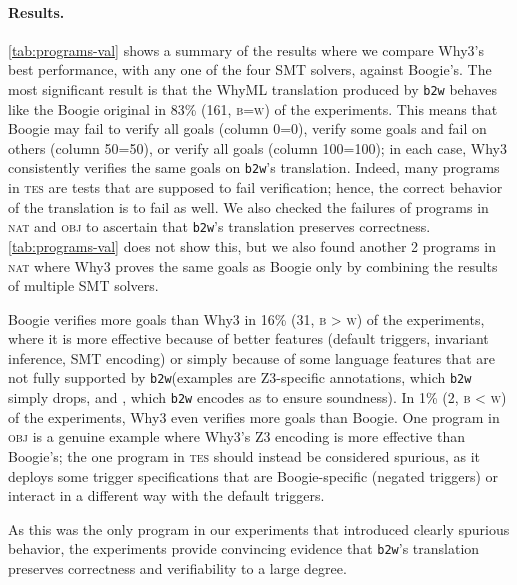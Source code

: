 \documentclass[a4paper,final]{llncs}
\makeatletter
\newif\iflong
\newcommand{\nat}{\textsc{nat}\xspace} \newcommand{\tes}{\textsc{tes}\xspace} \newcommand{\obj}{\textsc{obj}\xspace}
\newcommand{\btw}{\texttt{b2w}\xspace}
\newcommand{\Boogie}{Boogie\xspace}
\newcommand{\WhyML}{WhyML\xspace}
\newcommand{\Why}{Why3\xspace}
\newcommand{\tightParagraph}[1]{\paragraph{#1}}
\newcommand\tightParagraph{\@startsection{paragraph}{4}{\z@}{-5\p@ \@plus -4\p@ \@minus -4\p@}{-0.5em \@plus -0.22em \@minus -0.1em}{\normalfont\normalsize\itshape}}
\makeatother
\begin{document}
\tightParagraph{Results.}
\autoref{tab:programs-val} shows a summary of the results where we compare \Why's best performance, with any one of the four SMT solvers, against \Boogie's.
The most significant result is that the \WhyML translation produced by \btw behaves like the \Boogie original in 83\% (161, \textsc{b=w}) of the experiments.
This means that \Boogie may fail to verify all goals (column \textsc{0=0}), verify some goals and fail on others (column \textsc{50=50}), or verify all goals (column \textsc{100=100}); in each case, \Why consistently verifies the same goals on \btw's translation.
Indeed, many programs in \tes are tests that are supposed to fail verification; hence, the correct behavior of the translation is to fail as well.
We also checked the failures of programs in \nat and \obj to ascertain that \btw's translation preserves correctness.
\autoref{tab:programs-val} does not show this, but we also found another 2 programs in \nat \iflong(\verb|inv_survey/bst| and \verb|rotation/rotation_reverse|)\fi{} where \Why proves the same goals as \Boogie only by combining the results of multiple SMT solvers.


\Boogie verifies more goals than \Why in 16\% (31, \textsc{b > w}) of the experiments, where it is more effective because of better features (default triggers, invariant inference, SMT encoding) or simply because of some language features that are not fully supported by \btw (examples are Z3-specific annotations, which \btw simply drops, and , which \btw encodes as  to ensure soundness).
In 1\% (2, \textsc{b < w}) of the experiments, \Why even verifies more goals than \Boogie.
One program in \obj \iflong(\verb|rotation_by_copy|)\fi{} is a genuine example where \Why's Z3 encoding is more effective than \Boogie's\iflong\footnote{However, \Boogie also succeeds given a longer timeout thank the one used in the experiments.}\fi{}; the one program in \tes \iflong(\verb|test2/Quantifiers|)\fi{} should instead be considered spurious, as it deploys some trigger specifications that are \Boogie-specific (negated triggers) or interact in a different way with the default triggers.
\iflong
(Procedures \B{S}, \B{U0}, and \B{U1} use regular triggers whose translation to \Why yields a different behavior, probably because of \Why's default triggers differ from \Boogie's; procedures \B{W} and \B{X2} use negated triggers, which \btw ignore.)
\fi
As this was the only program in our experiments that introduced clearly spurious behavior, the experiments provide convincing evidence that \btw's translation preserves correctness and verifiability to a large degree.
\end{document}
